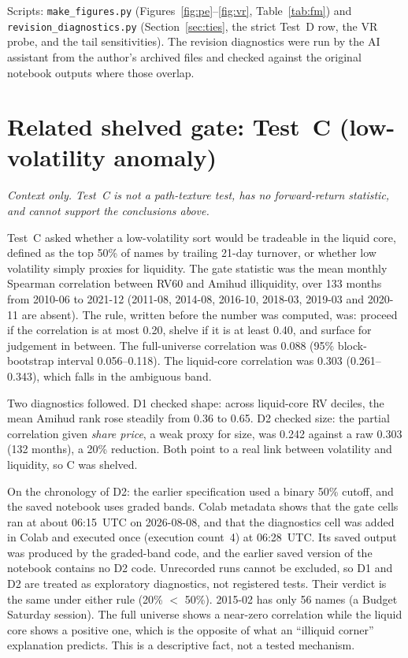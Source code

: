 \documentclass[11pt]{article}
\begin{document}
\noindent Scripts: \texttt{make\_figures.py} (Figures~\ref{fig:pe}--\ref{fig:vr},
Table~\ref{tab:fm}) and \texttt{revision\_diagnostics.py} (Section~\ref{sec:ties}, the strict
Test~D row, the VR probe, and the tail sensitivities). The revision diagnostics were run by
the AI assistant from the author's archived files and checked against the original
notebook outputs where those overlap.

\aistatement
{}

\appendix
\section{Related shelved gate: Test~C (low-volatility anomaly)}
\label{sec:testc}

\begin{mdframed}[backgroundcolor=gray!5,linecolor=gray!50]
\small
\noindent\textit{Context only. Test~C is not a path-texture test, has no forward-return
statistic, and cannot support the conclusions above.}

\smallskip
\noindent Test~C asked whether a low-volatility sort would be tradeable in the liquid
core, defined as the top 50\% of names by trailing 21-day turnover, or whether low
volatility simply proxies for liquidity. The gate statistic was the mean monthly Spearman
correlation between RV60 and Amihud illiquidity, over 133 months from 2010-06 to 2021-12
(2011-08, 2014-08, 2016-10, 2018-03, 2019-03 and 2020-11 are absent). The rule, written
before the number was computed, was: proceed if the correlation is at most 0.20, shelve if
it is at least 0.40, and surface for judgement in between. The full-universe correlation
was 0.088 (95\% block-bootstrap interval 0.056--0.118). The liquid-core correlation was
0.303 (0.261--0.343), which falls in the ambiguous band.

Two diagnostics followed. D1 checked shape: across liquid-core RV deciles, the mean Amihud
rank rose steadily from 0.36 to 0.65. D2 checked size: the partial correlation given
\emph{share price}, a weak proxy for size, was 0.242 against a raw 0.303 (132 months), a
20\% reduction. Both point to a real link between volatility and liquidity, so C was
shelved.

On the chronology of D2: the earlier specification used a binary 50\% cutoff, and the
saved notebook uses graded bands. Colab metadata shows that the gate cells ran at about
06:15~UTC on 2026-08-08, and that the diagnostics cell was added in Colab and executed once
(execution count~4) at 06:28~UTC. Its saved output was produced by the graded-band code, and
the earlier saved version of the notebook contains no D2 code. Unrecorded runs cannot be
excluded, so D1 and D2 are treated as exploratory diagnostics, not registered tests. Their
verdict is the same under either rule (20\% $<$ 50\%). 2015-02 has only 56 names (a Budget
Saturday session). The full universe shows a near-zero correlation while the liquid core
shows a positive one, which is the opposite of what an ``illiquid corner'' explanation
predicts. This is a descriptive fact, not a tested mechanism.
\end{mdframed}



\end{document}
